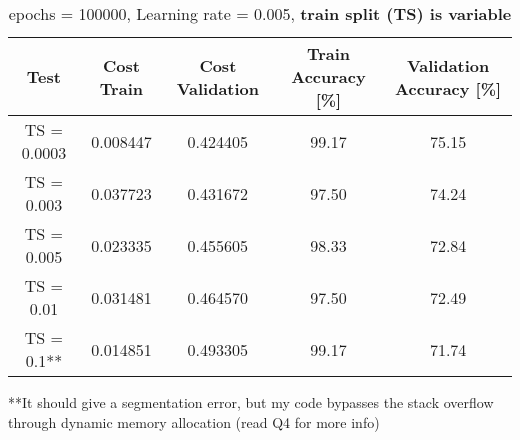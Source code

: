 \documentclass[12pt]{article}
\begin{document}
\begin{table}[h!]
    \centering
    \caption{epochs = 100000, Learning rate = 0.005, \textbf{train split (TS) is variable}}
    \label{table:3}
    \begin{tabular}{|c|c|c|c|c|}
         \hline
         Test & Cost Train & Cost Validation & Train Accuracy [\%] & Validation Accuracy [\%] \\ 
         \hline
         TS = 0.0003 & 0.008447 & 0.424405 & 99.17 & 75.15 \\
         \hline
         TS = 0.003 & 0.037723 & 0.431672 & 97.50 & 74.24 \\
         \hline
         TS = 0.005 & 0.023335 & 0.455605 & 98.33 & 72.84 \\
         \hline
         TS = 0.01 & 0.031481 & 0.464570 & 97.50 & 72.49 \\
         \hline
         TS = 0.1** & 0.014851 & 0.493305 & 99.17 & 71.74 \\
         \hline
    \end{tabular}
\end{table}
**It should give a segmentation error, but my code bypasses the stack overflow through dynamic memory allocation (read Q4 for more info)
\end{document}
